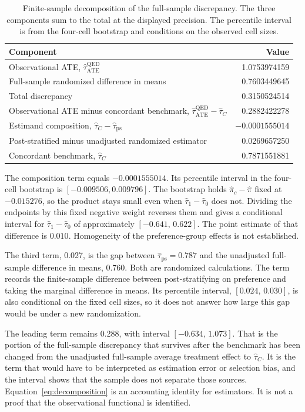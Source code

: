 \documentclass[11pt]{article}
\theoremstyle{remark}
\begin{document}
\begin{table}[t]
\centering
\caption{Finite-sample decomposition of the full-sample discrepancy. The three components sum to the total at the displayed precision. The percentile interval is from the four-cell bootstrap and conditions on the observed cell sizes.}
\label{tab:decomp}
\begin{tabular}{lr}
\toprule
Component & Value \\
\midrule
Observational ATE, $\widehat\tau^{\mathrm{QED}}_{\mathrm{ATE}}$ & 1.0753974159 \\
Full-sample randomized difference in means & 0.7603449645 \\
Total discrepancy & 0.3150524514 \\
\midrule
Observational ATE minus concordant benchmark, $\widehat\tau^{\mathrm{QED}}_{\mathrm{ATE}}-\widehat\tau_C$ & 0.2882422278 \\
Estimand composition, $\widehat\tau_C-\widehat\tau_{\mathrm{ps}}$ & $-0.0001555014$ \\
Post-stratified minus unadjusted randomized estimator & 0.0269657250 \\
\midrule
Concordant benchmark, $\widehat\tau_C$ & 0.7871551881 \\
\bottomrule
\end{tabular}
\end{table}

The composition term equals $-0.0001555014$. Its percentile interval in the four-cell bootstrap is $[-0.009506,\allowbreak 0.009796]$. The bootstrap holds $\widehat\pi_c-\widehat\pi$ fixed at $-0.015276$, so the product stays small even when $\widehat\tau_1-\widehat\tau_0$ does not. Dividing the endpoints by this fixed negative weight reverses them and gives a conditional interval for $\widehat\tau_1-\widehat\tau_0$ of approximately $[-0.641,\,0.622]$. The point estimate of that difference is $0.010$. Homogeneity of the preference-group effects is not established.

The third term, 0.027, is the gap between $\widehat\tau_{\mathrm{ps}}=0.787$ and the unadjusted full-sample difference in means, 0.760. Both are randomized calculations. The term records the finite-sample difference between post-stratifying on preference and taking the marginal difference in means. Its percentile interval, $[0.024,\,0.030]$, is also conditional on the fixed cell sizes, so it does not answer how large this gap would be under a new randomization.

The leading term remains 0.288, with interval $[-0.634,\,1.073]$. That is the portion of the full-sample discrepancy that survives after the benchmark has been changed from the unadjusted full-sample average treatment effect to $\widehat\tau_C$. It is the term that would have to be interpreted as estimation error or selection bias, and the interval shows that the sample does not separate those sources. Equation~\eqref{eq:decomposition} is an accounting identity for estimators. It is not a proof that the observational functional is identified.
\end{document}
